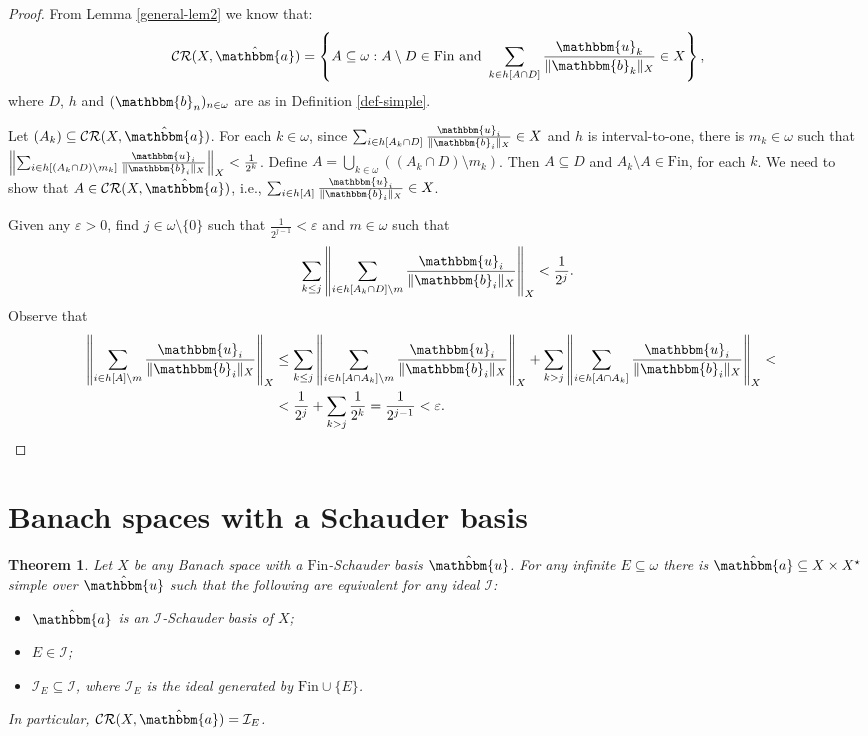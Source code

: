 \documentclass{amsart}
\newcommand{\I}{\mathcal{I}}
\newcommand{\Fin}{\mathrm{Fin}}
\newcommand{\CR}{\mathcal{CR}}
\newcommand{\w}{\mathbbm}
\newtheorem{theorem}{Theorem}[section]
\begin{document}
\begin{proof}
From Lemma \ref{general-lem2} we know that:
\[
\CR(X,\hat{\w{a}})=\left\{A\subseteq\omega: A\setminus D\in\Fin\text{ and }\sum_{k\in h[A\cap D]}\frac{\w{u}_{k}}{\|\w{b}_{k}\|_X}\in X\right\},
\]
where $D$, $h$ and $(\w{b}_n)_{n\in\omega}$ are as in Definition \ref{def-simple}. 

Let $(A_k)\subseteq \CR(X,\hat{\w{a}})$. For each $k\in\omega$, since $\sum_{i\in h[A_k\cap D]}\frac{\w{u}_{i}}{\|\w{b}_{i}\|_X}\in X$ and $h$ is interval-to-one, there is $m_k\in\omega$ such that $\left\|\sum_{i\in h[(A_k\cap D)\setminus m_k]}\frac{\w{u}_{i}}{\|\w{b}_{i}\|_X}\right\|_X<\frac{1}{2^k}$. Define $A=\bigcup_{k\in\omega}((A_k\cap D)\setminus m_k)$. Then $A\subseteq D$ and $A_k\setminus A\in\Fin$, for each $k$. We need to show that $A\in\CR(X,\hat{\w{a}})$, i.e., $\sum_{i\in h[A]}\frac{\w{u}_{i}}{\|\w{b}_{i}\|_X}\in X$. 

Given any $\varepsilon>0$, find $j\in\omega\setminus\{0\}$ such that $\frac{1}{2^{j-1}}<\varepsilon$ and $m\in\omega$ such that 
\[
\sum_{k\leq j}\left\|\sum_{i\in h[A_k\cap D]\setminus m}\frac{\w{u}_{i}}{\|\w{b}_{i}\|_X}\right\|_X<\frac{1}{2^{j}}.
\]
Observe that
\begin{align*}
    \left\|\sum_{i\in h[A]\setminus m}\frac{\w{u}_{i}}{\|\w{b}_{i}\|_X}\right\|_X & \leq\sum_{k\leq j}\left\|\sum_{i\in h[A\cap A_k]\setminus m}\frac{\w{u}_{i}}{\|\w{b}_{i}\|_X}\right\|_X+\sum_{k>j}\left\|\sum_{i\in h[A\cap A_k]}\frac{\w{u}_{i}}{\|\w{b}_{i}\|_X}\right\|_X< \cr
    & <\frac{1}{2^{j}}+\sum_{k>j}\frac{1}{2^k}=\frac{1}{2^{j-1}}<\varepsilon.
\end{align*}
\end{proof}



\section{Banach spaces with a Schauder basis}

\begin{theorem}
\label{thm-distinguishing}
Let $X$ be any Banach space with a $\Fin$-Schauder basis $\hat{\w{u}}$. For any infinite $E\subseteq\omega$ there is $\hat{\w{a}}\subseteq X\times X^\star$ simple over $\hat{\w{u}}$ such that the following are equivalent for any ideal $\I$:
\begin{itemize}
    \item[(a)] $\hat{\w{a}}$ is an $\I$-Schauder basis of $X$;
    \item[(b)] $E\in\I$;
    \item[(c)] $\I_E\subseteq\I$, where $\I_E$ is the ideal generated by $\Fin\cup\{E\}$.
\end{itemize}
In particular, $\CR(X,\hat{\w{a}})=\I_E$.
\end{theorem}
\end{document}
